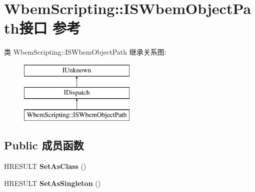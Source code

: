 \hypertarget{interface_wbem_scripting_1_1_i_s_wbem_object_path}{}\section{Wbem\+Scripting\+:\+:I\+S\+Wbem\+Object\+Path接口 参考}
\label{interface_wbem_scripting_1_1_i_s_wbem_object_path}
类 Wbem\+Scripting\+:\+:I\+S\+Wbem\+Object\+Path 继承关系图\+:\begin{figure}[H]
\begin{center}
\leavevmode
\includegraphics[height=3.000000cm]{interface_wbem_scripting_1_1_i_s_wbem_object_path}
\end{center}
\end{figure}
\subsection*{Public 成员函数}
\begin{DoxyCompactItemize}
\item 
\mbox{\label{interface_wbem_scripting_1_1_i_s_wbem_object_path_ae645c33383af456ced8ccdea03b443aa}} 
H\+R\+E\+S\+U\+LT {\bfseries Set\+As\+Class} ()
\item 
\mbox{\label{interface_wbem_scripting_1_1_i_s_wbem_object_path_a211627fbc29d74d01511b268536a381e}} 
H\+R\+E\+S\+U\+LT {\bfseries Set\+As\+Singleton} ()
\end{DoxyCompactItemize}
